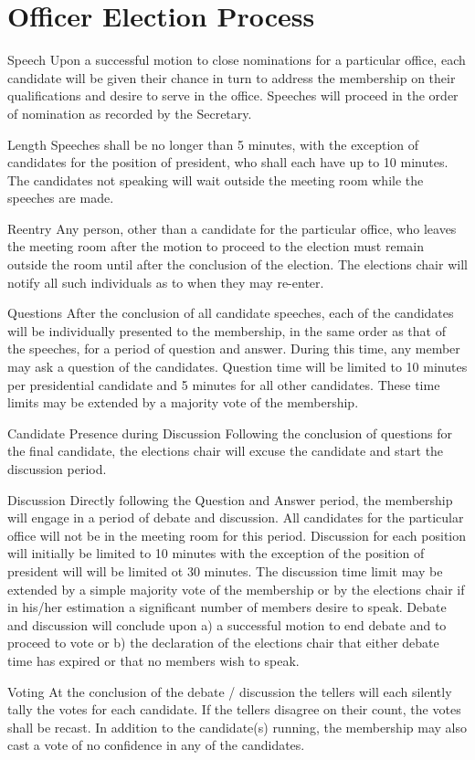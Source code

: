 \section{Officer Election Process}
\begin{enumsubsection}
\item{Speech} Upon a successful motion to close nominations for a particular office, each candidate will be given their chance in turn to address the membership on their qualifications and desire to serve in the office. Speeches will proceed in the order of nomination as recorded by the Secretary.
\begin{enumsubsubsection}
\item{Length} Speeches shall be no longer than 5 minutes, with the exception of candidates for the position of president, who shall each have up to 10 minutes. The candidates not speaking will wait outside the meeting room while the speeches are made. 
\item{Reentry} Any person, other than a candidate for the particular office, who leaves the meeting room after the motion to proceed to the election must remain outside the room until after the conclusion of the election. The elections chair will notify all such individuals as to when they may re-enter.
\end{enumsubsubsection}

\item{Questions} After the conclusion of all candidate speeches, each of the candidates will be individually presented to the membership, in the same order as that of the speeches, for a period of question and answer. During this time, any member may ask a question of the candidates. Question time will be limited to 10 minutes per presidential candidate and 5 minutes for all other candidates. These time limits may be extended by a majority vote of the membership. 
\item{Candidate Presence during Discussion} Following the conclusion of questions for the final candidate, the elections chair will excuse the candidate and start the discussion period.
\item{Discussion} Directly following the Question and Answer period, the membership will engage in a period of debate and discussion. All candidates for the particular office will not be in the meeting room for this period. Discussion for each position will initially be limited to 10 minutes with the exception of the position of president will will be limited ot 30 minutes. The discussion time limit may be extended by a simple majority vote of the membership or by the elections chair if in his/her estimation a significant number of members desire to speak. Debate and discussion will conclude upon a) a successful motion to end debate and to proceed to vote or b) the declaration of the elections chair that either debate time has expired or that no members wish to speak.
\item{Voting} At the conclusion of the debate / discussion the tellers will each silently tally the votes for each candidate. If the tellers disagree on their count, the votes shall be recast. In addition to the candidate(s) running, the membership may also cast a vote of no confidence in any of the candidates.


\end{enumsubsection}
